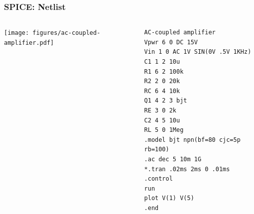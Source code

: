 \begin{frame}
\begin{columns}
\begin{column}{.3\textwidth}
\begin{center}
      \end{center}
    \end{column}
  \end{columns}
\end{frame}

\begin{frame}[fragile]
  \frametitle{SPICE: Netlist}
  \begin{columns}
    \begin{column}{.5\textwidth}
      \begin{center}
        \texttt{[image: figures/ac-coupled-amplifier.pdf]}
      \end{center}
    \end{column}
    \begin{column}{.5\textwidth}
     {\footnotesize
\begin{verbatim}
AC-coupled amplifier
Vpwr 6 0 DC 15V
Vin 1 0 AC 1V SIN(0V .5V 1KHz)
C1 1 2 10u
R1 6 2 100k
R2 2 0 20k
RC 6 4 10k
Q1 4 2 3 bjt
RE 3 0 2k
C2 4 5 10u
RL 5 0 1Meg
.model bjt npn(bf=80 cjc=5p rb=100)
.ac dec 5 10m 1G
*.tran .02ms 2ms 0 .01ms
.control
run
plot V(1) V(5)
.end
\end{verbatim}%
     }
   \end{column}
 \end{columns}
\end{frame}


